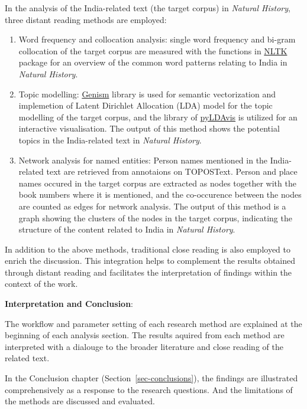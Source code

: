 \documentclass[
  12pt,
]{article}
\begin{document}
In the analysis of the India-related text (the target corpus) in
\emph{Natural History}, three distant reading methods are employed:

\begin{enumerate}
\def\labelenumi{\arabic{enumi}.}
\item
  Word frequency and collocation analysis: single word frequency and
  bi-gram collocation of the target corpus are measured with the
  functions in \href{https://www.nltk.org/}{NLTK} package for an
  overview of the common word patterns relating to India in
  \emph{Natural History}.
\item
  Topic modelling: \href{https://radimrehurek.com/gensim/}{Genism}
  library is used for semantic vectorization and implemetion of Latent
  Dirichlet Allocation (LDA) model for the topic modelling of the target
  corpus, and the library of
  \href{https://pyldavis.readthedocs.io/en/latest/index.htmlgenism}{pyLDAvis}
  is utilized for an interactive visualisation. The output of this
  method shows the potential topics in the India-related text in
  \emph{Natural History}.
\item
  Network analysis for named entities: Person names mentioned in the
  India-related text are retrieved from annotaions on TOPOSText. Person
  and place names occured in the target corpus are extracted as nodes
  together with the book numbers where it is mentioned, and the
  co-occurence between the nodes are counted as edges for network
  analysis. The output of this method is a graph showing the clusters of
  the nodes in the target corpus, indicating the structure of the
  content related to India in \emph{Natural History}.
\end{enumerate}

In addition to the above methods, traditional close reading is also
employed to enrich the discussion. This integration helps to complement
the results obtained through distant reading and facilitates the
interpretation of findings within the context of the work.

\textbf{Interpretation and Conclusion}:

The workflow and parameter setting of each research method are explained
at the beginning of each analysis section. The results aquired from each
method are interpreted with a dialouge to the broader literature and
close reading of the related text.

In the Conclusion chapter (Section~\ref{sec-conclusions}), the findings
are illustrated comprehensively as a response to the research questions.
And the limitations of the methods are discussed and evaluated.
\end{document}
